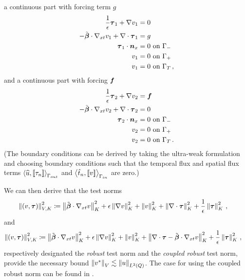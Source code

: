 \documentclass{article}
\begin{document}
a continuous part with forcing term $g$
\begin{align*}
\frac{1}{\epsilon}\boldsymbol\tau_1+\nabla v_1 &=0\\
-\tilde{\boldsymbol\beta}\cdot\nabla_{xt} v_1 + \nabla\cdot\boldsymbol\tau_1 &= g\\
\boldsymbol\tau_1\cdot\boldsymbol n_x &= 0 \text{ on } \Gamma_-\\
v_1 &= 0 \text{ on } \Gamma_+\\
v_1 &= 0 \text{ on } \Gamma_T\,,
\end{align*}
and a continuous part with forcing $\boldsymbol f$
\begin{align*}
\frac{1}{\epsilon}\boldsymbol\tau_2+\nabla v_2 &=\boldsymbol f\\
-\tilde{\boldsymbol\beta}\cdot\nabla_{xt} v_2 + \nabla\cdot\boldsymbol\tau_2 &= 0\\
\boldsymbol\tau_2\cdot\boldsymbol n_x &= 0 \text{ on } \Gamma_-\\
v_2 &= 0 \text{ on } \Gamma_+\\
v_2 &= 0 \text{ on } \Gamma_T\,.
\end{align*}
(The boundary conditions can be derived by taking the ultra-weak formulation and choosing boundary conditions such that the temporal flux and spatial flux terms $\left\langle \widehat{u}, \left[ \![\tau_n]\! \right] \right\rangle_{\Gamma_{out}}$ and $\left\langle \hat t_n,\left[ \![v]\! \right] \right\rangle_{\Gamma_{in}}$ are zero.)

We can then derive that the test norms
\begin{align}
\label{eq:robustnorm}
\left\| \left( v,\boldsymbol\tau \right) \right\|_{V,K}^2 &\coloneqq
\left\| \tilde{\boldsymbol\beta}\cdot\nabla_{xt} v \right\|_K^2
+ \epsilon\left\| \nabla v \right\|_K^2
+ \left\| v \right\|^2_K
+ \left\| \nabla\cdot \boldsymbol\tau \right\|_K^2
+ \frac{1}{\epsilon}\left\| \boldsymbol\tau \right\|_K^2\,,
\end{align}
and
\begin{align}
\label{eq:coupledrobustnorm}
\left\| \left( v,\boldsymbol\tau \right) \right\|_{V,K}^2 &\coloneqq
\left\| \tilde{\boldsymbol\beta}\cdot\nabla_{xt} v \right\|_K^2
+ \epsilon\left\| \nabla v \right\|_K^2
+ \left\| v \right\|^2_K
+ \left\| \nabla\cdot \boldsymbol\tau - \tilde{\boldsymbol\beta}\cdot\nabla_{xt} v \right\|_K^2
+ \frac{1}{\epsilon}\left\| \boldsymbol\tau \right\|_K^2\,,
\end{align}
respectively designated the \emph{robust} test norm and the \emph{coupled robust} test norm,
provide the necessary bound $\left\| v^* \right\|_V \lesssim \left\| u \right\|_{L^2\left( Q \right)}$.
The case for using the coupled robust norm can be found in \cite{JesseDissertation}.
\end{document}
